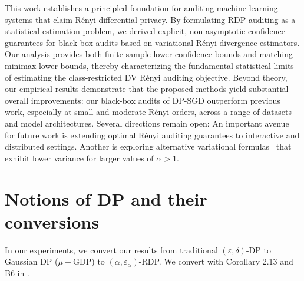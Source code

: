 \documentclass{article}
\theoremstyle{plain}
\theoremstyle{definition}
\theoremstyle{remark}
\begin{document}
This work establishes a principled foundation for auditing machine learning systems that claim R\'enyi differential privacy. By formulating RDP auditing as a statistical estimation problem, we derived explicit, non-asymptotic confidence guarantees for black-box audits based on variational
R\'enyi divergence estimators. Our analysis provides both finite-sample lower confidence bounds and matching minimax lower bounds, thereby characterizing the
fundamental statistical limits of estimating the class-restricted DV R\'enyi auditing objective.
Beyond theory, our empirical results demonstrate that the proposed methods yield substantial overall improvements: our black-box audits of DP-SGD outperform previous work, especially
at small and moderate R\'enyi orders, 
across a range of datasets and model architectures. 
Several directions remain open:
An important avenue for future work is extending optimal R\'enyi auditing guarantees to interactive and distributed settings.
Another is exploring alternative variational formulas~\cite{birrell2023functionspace} that exhibit lower
variance for larger values of $\alpha > 1$.

\clearpage






\clearpage
\appendix

%

\newpage


\section{Notions of DP and their conversions}
In our experiments, we convert our results from traditional $(\varepsilon, \delta)$-DP to Gaussian DP ($\mu-$GDP) \cite{dong2019gaussian} to $(\alpha, \varepsilon_\alpha)$-RDP. We convert with Corollary 2.13 and B6 in \cite{dong2019gaussian}.
\end{document}
